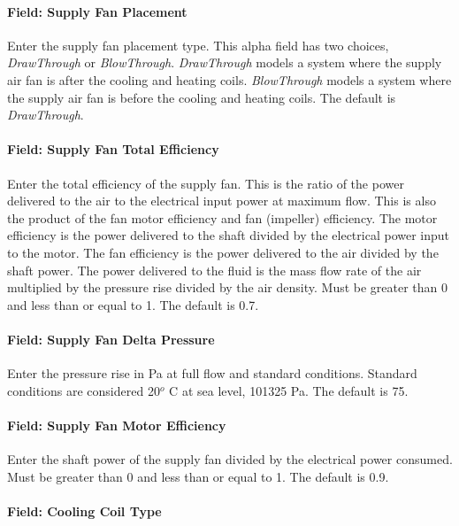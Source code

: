 \paragraph{Field: Supply Fan Placement}\label{field-supply-fan-placement-3}

Enter the supply fan placement type. This alpha field has two choices, \emph{DrawThrough} or \emph{BlowThrough}. \emph{DrawThrough} models a system where the supply air fan is after the cooling and heating coils. \emph{BlowThrough} models a system where the supply air fan is before the cooling and heating coils. The default is \emph{DrawThrough}.

\paragraph{Field: Supply Fan Total Efficiency}\label{field-supply-fan-total-efficiency-4}

Enter the total efficiency of the supply fan. This is the ratio of the power delivered to the air to the electrical input power at maximum flow. This is also the product of the fan motor efficiency and fan (impeller) efficiency. The motor efficiency is the power delivered to the shaft divided by the electrical power input to the motor. The fan efficiency is the power delivered to the air divided by the shaft power. The power delivered to the fluid is the mass flow rate of the air multiplied by the pressure rise divided by the air density. Must be greater than 0 and less than or equal to 1. The default is 0.7.

\paragraph{Field: Supply Fan Delta Pressure}\label{field-supply-fan-delta-pressure-3}

Enter the pressure rise in Pa at full flow and standard conditions. Standard conditions are considered 20\(^{o}\) C at sea level, 101325 Pa. The default is 75.

\paragraph{Field: Supply Fan Motor Efficiency}\label{field-supply-fan-motor-efficiency-4}

Enter the shaft power of the supply fan divided by the electrical power consumed. Must be greater than 0 and less than or equal to 1. The default is 0.9.

\paragraph{Field: Cooling Coil Type}\label{field-cooling-coil-type-4}

